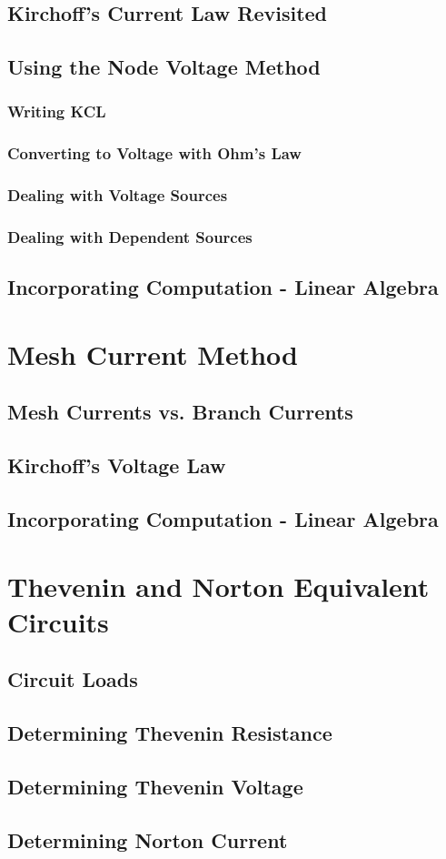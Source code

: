 \documentclass[a4paper,11pt]{book}
\begin{document}
\section{Kirchoff's Current Law Revisited}
\section{Using the Node Voltage Method}
\subsection*{Writing KCL}
\subsection*{Converting to Voltage with Ohm's Law}
\subsection*{Dealing with Voltage Sources}
\subsection*{Dealing with Dependent Sources}
\section{Incorporating Computation - Linear Algebra}
\chapter{Mesh Current Method}
\section{Mesh Currents vs. Branch Currents}
\section{Kirchoff's Voltage Law}
\section{Incorporating Computation - Linear Algebra}
\chapter{Thevenin and Norton Equivalent Circuits}
\section{Circuit Loads}
\section{Determining Thevenin Resistance}
\section{Determining Thevenin Voltage}
\section{Determining Norton Current}
\end{document}
